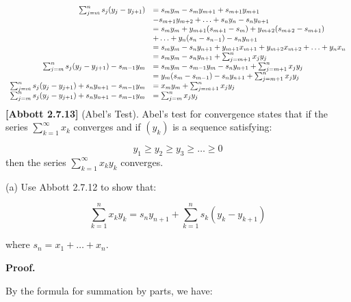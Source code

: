 \documentclass[10pt]{article}
\begin{document}
\begin{gather*}
\begin{array}{ r l }
\sum _{j=m}^{n} s_{j}( y_{j} -y_{j+1}) & =s_{m} y_{m} -s_{m} y_{m+1} +s_{m+1} y_{m+1}\\
 & -s_{m+1} y_{m+2} +\dotsc +s_{n} y_{n} -s_{n} y_{n+1}\\
 & =s_{m} y_{m} +y_{m+1}( s_{m+1} -s_{m}) +y_{m+2}( s_{m+2} -s_{m+1})\\
 & +\dotsc +y_{n}( s_{n} -s_{n-1}) -s_{n} y_{n+1}\\
 & =s_{m} y_{m} -s_{n} y_{n+1} +y_{m+1} x_{m+1} +y_{m+2} x_{m+2} +\dotsc +y_{n} x_{n}\\
 & =s_{m} y_{m} -s_{n} y_{n+1} +\sum _{j=m+1}^{n} x_{j} y_{j}\\
\sum _{j=m}^{n} s_{j}( y_{j} -y_{j+1}) -s_{m-1} y_{m} & =s_{m} y_{m} -s_{m-1} y_{m} -s_{n} y_{n+1} +\sum _{j=m+1}^{n} x_{j} y_{j}\\
 & =y_{m}( s_{m} -s_{m-1}) -s_{n} y_{n+1} +\sum _{j=m+1}^{n} x_{j} y_{j}\\
\sum _{j=m}^{n} s_{j}( y_{j} -y_{j+1}) +s_{n} y_{n+1} -s_{m-1} y_{m} & =x_{m} y_{m} +\sum _{j=m+1}^{n} x_{j} y_{j}\\
\sum _{j=m}^{n} s_{j}( y_{j} -y_{j+1}) +s_{n} y_{n+1} -s_{m-1} y_{m} & =\sum _{j=m}^{n} x_{j} y_{j}
\end{array}\\
\end{gather*}
\textbf{[Abbott 2.7.13]} (Abel's Test). Abel's test for convergence states that if the series $\displaystyle \sum _{k=1}^{\infty } x_{k}$ converges and if $\displaystyle ( y_{k})$ is a sequence satisfying:


\begin{equation*}
y_{1} \geq y_{2} \geq y_{3} \geq \dotsc \geq 0
\end{equation*}
then the series $\displaystyle \sum _{k=1}^{\infty } x_{k} y_{k}$ converges. 

(a) Use Abbott 2.7.12 to show that:


\begin{equation*}
\sum _{k=1}^{n} x_{k} y_{k} =s_{n} y_{n+1} +\sum _{k=1}^{n} s_{k}( y_{k} -y_{k+1})
\end{equation*}


where $\displaystyle s_{n} =x_{1} +\dotsc +x_{n}$.



\textbf{Proof.}



By the formula for summation by parts, we have:
\end{document}
